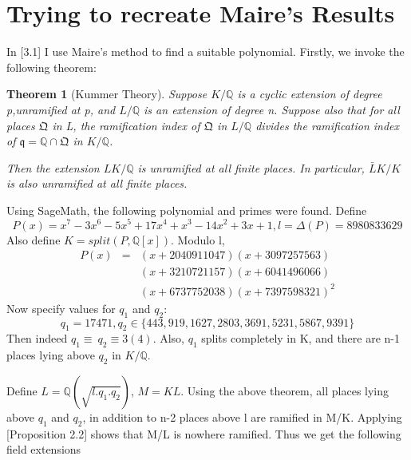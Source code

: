 \documentclass[preprint,12pt,reqno]{elsarticle}
\newtheorem{theorem}{Theorem}
\begin{document}
\section{Trying to recreate Maire's Results}
In \cite{MAIR}[3.1] I use Maire's method to find a suitable polynomial.
Firstly, we invoke the following theorem:
\begin{theorem}[Kummer Theory]
Suppose $K/\mathbb{Q}$ is a cyclic extension of degree p,unramified at p, and $L/\mathbb{Q}$ is an extension of degree n. Suppose also that for all places $\mathfrak{Q}$ in L, the ramification index of $\mathfrak{Q}$ in $L/\mathbb{Q}$ divides the ramification index of $\mathfrak{q} = \mathbb{Q}\cap\mathfrak{Q}$ in $K/\mathbb{Q}$. \par
Then the extension $LK/\mathbb{Q}$ is unramified at all finite places. In particular, $\bar{L}K/K$ is also unramified at all finite places.
\end{theorem}
Using SageMath, the following polynomial and primes were found. Define 
\begin{equation}
    P(x) = x^7-3x^6-5x^5+17x^4+x^3-14x^2+3x+1, l=\Delta(P)=8980833629
\end{equation}
Also define $K=split(P,\mathbb{Q}[x])$. Modulo l,
\begin{eqnarray*}
        P(x)&=&(x+2040911047)(x+3097257563)\\ & & {} (x+3210721157)(x+6041496066)\\ & & {}(x+6737752038)(x+7397598321)^2
\end{eqnarray*}
Now specify values for $q_1$ and $q_2$:
\begin{equation}
    q_1=17471,q_2\in\{443,919,1627,2803,3691,5231,5867,9391\}
\end{equation}
Then indeed $q_1\equiv\:q_2\equiv3(4)$. Also, $q_1$ splits completely in K, and there are n-1 places lying above $q_2$ in $K/\mathbb{Q}$.
\par
Define $L=\mathbb{Q}(\sqrt{l.q_1.q_2})$, $M=KL$. Using the above theorem, all places lying above $q_1$ and $q_2$, in addition to n-2 places above l are ramified in M/K.  Applying \cite{MAIR}[Proposition 2.2] shows that M/L is nowhere ramified. Thus we get the following field extensions
\begin{center}
\end{center}
\end{document}
